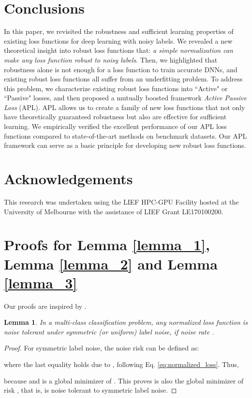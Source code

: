 \documentclass{article}
\newtheorem{lemma}{Lemma}
\begin{document}
\section{Conclusions}\label{sec:conclusion}
In this paper, we revisited the robustness and sufficient learning properties of existing loss functions for deep learning with noisy labels. We revealed a new theoretical insight into robust loss functions that: \emph{a simple normalization can make any loss function robust to noisy labels}. Then, we highlighted that robustness alone is not enough for a loss function to train accurate DNNs, and existing robust loss functions all suffer from an underfitting problem. To address this problem, we characterize existing robust loss functions into ``Active" or ``Passive" losses, and then proposed a mutually boosted framework \emph{Active Passive Loss} (APL). APL allows us to create a family of new loss functions that not only have theoretically guaranteed robustness but also are effective for sufficient learning.
We empirically verified the excellent performance of our APL loss functions compared to state-of-the-art methods on benchmark datasets.
Our APL framework can serve as a basic principle for developing new robust loss functions.

\section*{Acknowledgements}
This research was undertaken using the LIEF HPC-GPU Facility hosted at the University of Melbourne with the assistance of LIEF Grant LE170100200.

\vfill\pagebreak





\newpage
\appendix
\onecolumn

\setcounter{lemma}{0}

\section{Proofs for Lemma \ref{lemma_1}, Lemma \ref{lemma_2} and Lemma \ref{lemma_3}}\label{appendix_proof}
Our proofs are inspired by \cite{ghosh2017robust}.

\begin{lemma}
In a multi-class classification problem, any normalized loss function  is noise tolerant under symmetric (or uniform) label noise, if noise rate .
\end{lemma}
\begin{proof}
For symmetric label noise, the noise risk can be defined as:

where the last equality holds due to , following Eq. \eqref{eq:normalized_loss}. Thus,
	
because  and  is a global minimizer of . This proves  is also the global minimizer of risk , that is,  is noise tolerant to symmetric label noise. 
\end{proof}
\end{document}
